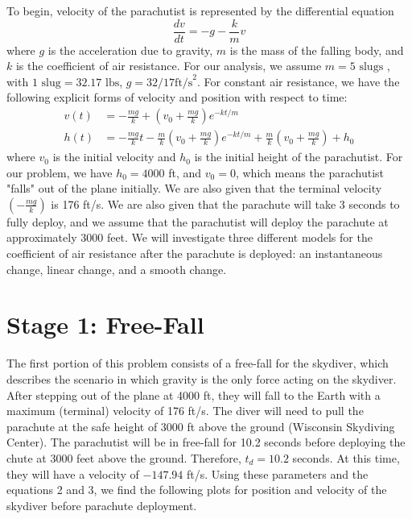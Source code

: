 \documentclass{article}
\begin{document}
    To begin, velocity of the parachutist is represented by the differential equation
    \begin{equation}
        \frac{dv}{dt} = -g - \frac{k}{m}v
    \end{equation}
    where $g$ is the acceleration due to gravity, $m$ is the mass of the falling body, and $k$ is the coefficient of air resistance. For our analysis, we assume $m = 5 \text{ slugs }$, with $1 \text{ slug} = 32.17 \text{ lbs}$, $g = 32/17 \text{ft/s}^2$. For constant air resistance, we have the following explicit forms of velocity and position with respect to time:
    \begin{align}
        v(t) &= -\frac{mg}{k} + \left(v_0 + \frac{mg}{k}\right)e^{-kt/m} \\
        h(t) &= -\frac{mg}{k}t - \frac{m}{k}\left(v_0 + \frac{mg}{k}\right)e^{-kt/m} + \frac{m}{k}\left(v_0 + \frac{mg}{k}\right) + h_0
    \end{align}
    where $v_0$ is the initial velocity and $h_0$ is the initial height of the parachutist. For our problem, we have $h_0 = 4000$ ft, and $v_0 = 0$, which means the parachutist "falls" out of the plane initially. We are also given that the terminal velocity $\left(-\frac{mg}{k}\right)$ is 176 ft/s. We are also given that the parachute will take 3 seconds to fully deploy, and we assume that the parachutist will deploy the parachute at approximately 3000 feet. We will investigate three different models for the coefficient of air resistance after the parachute is deployed: an instantaneous change, linear change, and a smooth change.

\section*{Stage 1: Free-Fall}

    The first portion of this problem consists of a free-fall for the skydiver, which describes the scenario in which gravity is the only force acting on the skydiver. After stepping out of the plane at 4000 ft, they will fall to the Earth with a maximum (terminal) velocity of 176 ft/s. The diver will need to pull the parachute at the safe height of 3000 ft above the ground (Wisconsin Skydiving Center). The parachutist will be in free-fall for 10.2 seconds before deploying the chute at 3000 feet above the ground. Therefore, $t_d = 10.2$ seconds. At this time, they will have a velocity of $-147.94$ ft/s. Using these parameters and the equations 2 and 3, we find the following plots for position and velocity of the skydiver before parachute deployment.
\end{document}
